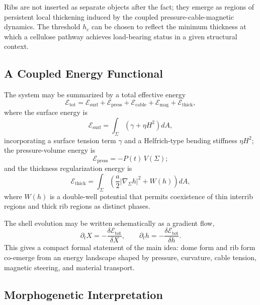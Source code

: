 \documentclass[12pt,a4paper]{article}
\begin{document}
Ribs are not inserted as separate objects after the fact; they emerge
as regions of persistent local thickening induced by the coupled
pressure-cable-magnetic dynamics. The threshold $h_c$ can be chosen
to reflect the minimum thickness at which a cellulose pathway achieves
load-bearing status in a given structural context.

\subsection{A Coupled Energy Functional}

The system may be summarized by a total effective energy
\begin{equation}
\mathcal{E}_{\mathrm{tot}}
= \mathcal{E}_{\mathrm{surf}}
+ \mathcal{E}_{\mathrm{press}}
+ \mathcal{E}_{\mathrm{cable}}
+ \mathcal{E}_{\mathrm{mag}}
+ \mathcal{E}_{\mathrm{thick}},
\end{equation}
where the surface energy is
\begin{equation}
\mathcal{E}_{\mathrm{surf}}
= \int_\Sigma \left(\gamma + \eta H^2\right) dA,
\end{equation}
incorporating a surface tension term $\gamma$ and a Helfrich-type
bending stiffness $\eta H^2$; the pressure-volume energy is
\begin{equation}
\mathcal{E}_{\mathrm{press}} = -P(t)\,V(\Sigma);
\end{equation}
and the thickness regularization energy is
\begin{equation}
\mathcal{E}_{\mathrm{thick}}
= \int_\Sigma \left(
\frac{a}{2}|\nabla_\Sigma h|^2 + W(h)
\right) dA,
\end{equation}
where $W(h)$ is a double-well potential that permits coexistence of
thin interrib regions and thick rib regions as distinct phases.

The shell evolution may be written schematically as a gradient flow,
\begin{equation}
\partial_t X = -\frac{\delta \mathcal{E}_{\mathrm{tot}}}{\delta X},
\qquad
\partial_t h = -\frac{\delta \mathcal{E}_{\mathrm{tot}}}{\delta h}.
\end{equation}
This gives a compact formal statement of the main idea: dome form and
rib form co-emerge from an energy landscape shaped by pressure,
curvature, cable tension, magnetic steering, and material transport.

\subsection{Morphogenetic Interpretation}
\end{document}
